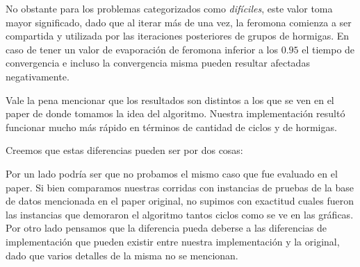 \documentclass[a4paper,spanish]{article}
\begin{document}
No obstante para los problemas categorizados como \emph{difíciles}, este valor toma mayor
significado, dado que al iterar más de una vez, la feromona comienza a ser compartida y
utilizada por las iteraciones posteriores de grupos de hormigas. En caso de tener un valor
de evaporación de feromona inferior a los $0.95$ el tiempo de convergencia e incluso la
convergencia misma pueden resultar afectadas negativamente.

Vale la pena mencionar que los resultados son distintos a los que se ven en el paper de
donde tomamos la idea del algoritmo. Nuestra implementación resultó funcionar mucho más rápido
en términos de cantidad de ciclos y de hormigas.

Creemos que estas diferencias pueden ser por dos cosas: 

Por un lado podría ser que no probamos el mismo caso que fue evaluado en el paper. Si bien 
comparamos nuestras corridas con instancias de pruebas de la base de datos mencionada en el paper
original, no supimos con exactitud cuales fueron las instancias que demoraron el algoritmo tantos
ciclos como se ve en las gráficas. Por otro lado pensamos que la diferencia pueda deberse a las
diferencias de implementación que pueden existir entre nuestra implementación y la original, dado
que varios detalles de la misma no se mencionan.


\clearpage


\end{document}
